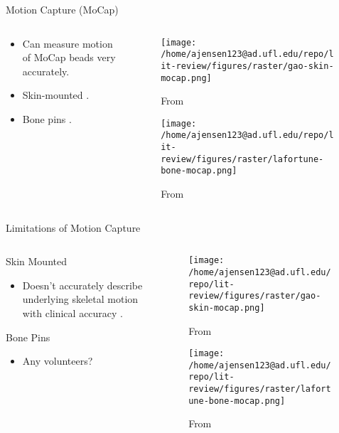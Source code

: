 \documentclass[presentation, aspectratio=1610]{beamer}
\begin{document}
\begin{frame}[label={sec:org697ebb4}]{Motion Capture (MoCap)}
\begin{columns}
\begin{column}{0.5\columnwidth}
\begin{itemize}
\item Can measure motion of MoCap beads very accurately.
\item Skin-mounted \autocites{gaoInvestigationSoftTissue2008}[][]{kuoInfluenceSoftTissue2011}[][]{linEffectsSoftTissue2016}.
\item Bone pins \autocite{lafortuneThreedimensionalKinematicsHuman1992}.
\end{itemize}
\end{column}
\begin{column}{0.6\columnwidth}
\begin{figure}[htbp]
\centering
\texttt{[image: /home/ajensen123@ad.ufl.edu/repo/lit-review/figures/raster/gao-skin-mocap.png]}
\caption{From \autocite{gaoInvestigationSoftTissue2008}}
\end{figure}
\begin{figure}[htbp]
\centering
\texttt{[image: /home/ajensen123@ad.ufl.edu/repo/lit-review/figures/raster/lafortune-bone-mocap.png]}
\caption{From \autocite{lafortuneThreedimensionalKinematicsHuman1992}}
\end{figure}
\end{column}
\end{columns}
\end{frame}
\begin{frame}[label={sec:orgb12eb38}]{Limitations of Motion Capture}
\begin{columns}
\begin{column}{0.5\columnwidth}
Skin Mounted
\begin{itemize}
\item Doesn't accurately describe underlying skeletal motion with clinical accuracy \autocites{gaoInvestigationSoftTissue2008}[][]{kuoInfluenceSoftTissue2011}[][]{linEffectsSoftTissue2016}.
\end{itemize}
Bone Pins
\begin{itemize}
\item Any volunteers?
\end{itemize}
\end{column}
\begin{column}{0.6\columnwidth}
\begin{figure}[htbp]
\centering
\texttt{[image: /home/ajensen123@ad.ufl.edu/repo/lit-review/figures/raster/gao-skin-mocap.png]}
\caption{From \autocite{gaoInvestigationSoftTissue2008}}
\end{figure}
\begin{figure}[htbp]
\centering
\texttt{[image: /home/ajensen123@ad.ufl.edu/repo/lit-review/figures/raster/lafortune-bone-mocap.png]}
\caption{From \autocite{lafortuneThreedimensionalKinematicsHuman1992}}
\end{figure}
\end{column}
\end{columns}
\end{frame}
\end{document}
